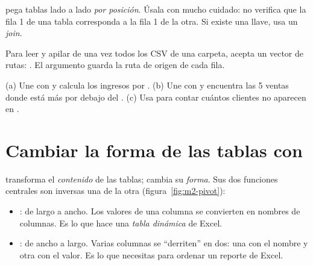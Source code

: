  pega tablas lado a lado \emph{por posición}. Úsala
con mucho cuidado: no verifica que la fila 1 de una tabla corresponda a la
fila 1 de la otra. Si existe una llave, usa un \emph{join}.

\begin{consejo}
Para leer y apilar de una vez todos los CSV de una carpeta, 
acepta un vector de rutas:
. El argumento  guarda la ruta de origen de cada fila.
\end{consejo}

\begin{hazlotu}
(a) Une  con  y calcula los ingresos
por . (b) Une  con  y encuentra
las 5 ventas donde  está más por debajo del
. (c) Usa  para contar cuántos clientes no
aparecen en .
\end{hazlotu}

\section{Cambiar la forma de las tablas con \texorpdfstring{}{tidyr}}
\label{sec:m2-tidyr}

 transforma el \emph{contenido} de las tablas;
 cambia su \emph{forma}. Sus dos funciones centrales son
inversas una de la otra (figura~\ref{fig:m2-pivot}):

\begin{itemize}
  \item {}: de largo a ancho. Los valores de una columna
        se convierten en nombres de columnas. Es lo que hace una
        \emph{tabla dinámica} de Excel.
  \item {}: de ancho a largo. Varias columnas se
        ``derriten'' en dos: una con el nombre y otra con el valor. Es lo que
        necesitas para ordenar un reporte de Excel.
\end{itemize}

